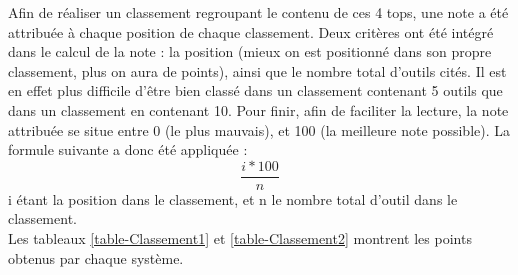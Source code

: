 \documentclass[paper=a4, fontsize=11pt]{scrartcl}
\begin{document}
Afin de réaliser un classement regroupant le contenu de ces 4 tops, une note a été attribuée à chaque position de chaque classement. Deux critères ont été intégré dans le calcul de la note : la position (mieux on est positionné dans son propre classement, plus on aura de points), ainsi que le nombre total d'outils cités. Il est en effet plus difficile d'être bien classé dans un classement contenant 5 outils que dans un classement en contenant 10. Pour finir, afin de faciliter la lecture, la note attribuée se situe entre 0 (le plus mauvais), et 100 (la meilleure note possible). La formule suivante a donc été appliquée :
\[\frac{i * 100}{n}\]
i étant la position dans le classement, et n le nombre total d'outil dans le classement.\\

Les tableaux \ref{table-Classement1} et \ref{table-Classement2} montrent les points obtenus par chaque système.
\end{document}
